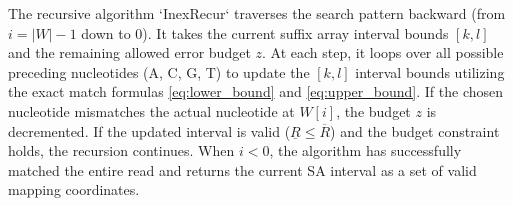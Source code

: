 \documentclass[11pt, a4paper]{article}
\begin{document}
The recursive algorithm `InexRecur` traverses the search pattern backward (from $i = |W|-1$ down to $0$). It takes the current suffix array interval bounds $[k, l]$ and the remaining allowed error budget $z$. At each step, it loops over all possible preceding nucleotides (A, C, G, T) to update the $[k, l]$ interval bounds utilizing the exact match formulas \eqref{eq:lower_bound} and \eqref{eq:upper_bound}. If the chosen nucleotide mismatches the actual nucleotide at $W[i]$, the budget $z$ is decremented. If the updated interval is valid ($\underline{R} \leq \overline{R}$) and the budget constraint holds, the recursion continues. When $i < 0$, the algorithm has successfully matched the entire read and returns the current SA interval as a set of valid mapping coordinates.
\end{document}
